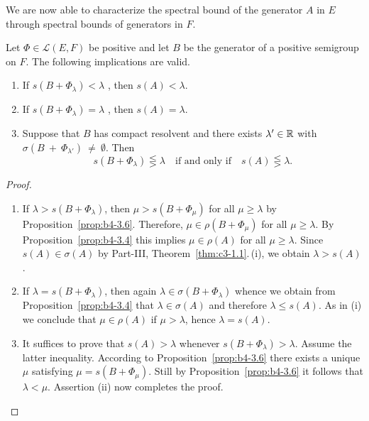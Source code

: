 We are now able to characterize the spectral bound of the generator $A$ in $E$ through spectral bounds of generators in $F$.
\begin{theorem}\label{thm:b4-3.7}
	Let $\Phi \in \mathcal{L}(E,F)$ be positive and let $B$ be the generator of a positive semigroup on $F$. 
	The following implications are valid.
	\begin{enumerate}[\upshape (i)]
		\item If\/ $s(B + \Phi_{\lambda}) < \lambda$ , then $s(A) < \lambda$.
        
		\item If\/ $s(B + \Phi_{\lambda}) = \lambda$ , then $s(A) = \lambda$.
        
		\item Suppose that $B$ has compact resolvent and there exists $\lambda' \in \mathbb{R}$ with $\sigma(B~+~\Phi_{\lambda'})~\neq~\emptyset$. 
		Then
		\begin{equation}\label{eq:b4-3.6}
		s(B + \Phi_{\lambda}) \lesseqgtr \lambda \quad \text{if and only if} \quad s(A) \lesseqgtr \lambda.
		\end{equation}
	\end{enumerate}
\end{theorem}
\begin{proof}
	\begin{enumerate}[\upshape (i), wide, labelindent=.25em]
	\item 
	If\/ $\lambda > s(B + \Phi_{\lambda})$, then $\mu > s(B + \Phi_{\mu})$ for all $\mu \geq \lambda$ by Proposition~\ref{prop:b4-3.6}.  
	Therefore, $\mu \in \rho(B + \Phi_{\mu})$ for all $\mu \geq \lambda$. 
	By Proposition~\ref{prop:b4-3.4} this implies $\mu \in \rho(A)$ for all $\mu \geq \lambda$. 
	Since $s(A) \in \sigma(A)$ by Part-III, Theorem~\ref{thm:c3-1.1}.\,(i), we obtain $\lambda > s(A)$.
	
    \item 
	If\/ $\lambda = s(B + \Phi_{\lambda})$, then again $\lambda \in \sigma(B + \Phi_{\lambda})$ whence we obtain from Proposition~\ref{prop:b4-3.4} that $\lambda \in \sigma(A)$ and therefore $\lambda \leq s(A)$. 
	As in (i) we conclude that $\mu \in \rho(A)$ if\/ $\mu > \lambda$, hence $\lambda = s(A)$.
	
	\item 
	It suffices to prove that $s(A) > \lambda$ whenever $s(B + \Phi_{\lambda}) > \lambda$. 
	Assume the latter inequality. 
	According to Proposition~\ref{prop:b4-3.6} there exists a unique $\mu$ satisfying $\mu = s(B + \Phi_{\mu})$. 
	Still by Proposition~\ref{prop:b4-3.6} it follows that $\lambda < \mu$. 
	Assertion (ii) now completes the proof.
	\qedhere
	\end{enumerate}
\end{proof}
